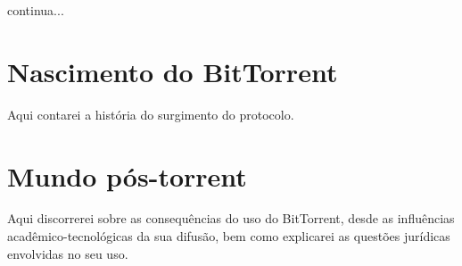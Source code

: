continua...

\section{Nascimento do BitTorrent}

Aqui contarei a história do surgimento do protocolo.

\section{Mundo pós-torrent}

Aqui discorrerei sobre as consequências do uso do BitTorrent, desde as influências acadêmico-tecnológicas da sua difusão, bem como explicarei as questões jurídicas envolvidas no seu uso.

\clearpage
